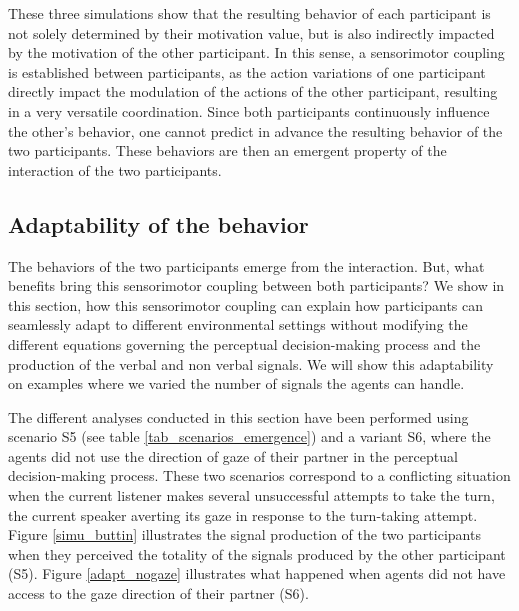 These three simulations show that the resulting behavior of each participant is not solely determined by their motivation value, but is also indirectly impacted by the motivation of the other participant. In this sense, a sensorimotor coupling is established between participants, as the action variations of one participant directly impact the modulation of the actions of the other participant, resulting in a very versatile coordination. Since both participants continuously influence the other's behavior, one cannot predict in advance the resulting behavior of the two participants. These behaviors are then an emergent property of the interaction of the two participants. 

\subsection{Adaptability of the behavior}

The behaviors of the two participants emerge from the interaction. But, what benefits bring this sensorimotor coupling between both participants?
We show in this section, how this sensorimotor coupling can explain how participants can seamlessly adapt to different environmental settings without modifying the different equations governing the perceptual decision-making process and the production of the verbal and non verbal signals. We will show this adaptability on examples where we varied the number of signals the agents can handle. 


The different analyses conducted in this section have been performed using scenario S5 (see table \ref{tab_scenarios_emergence}) and a variant S6, where the agents did not use the direction of gaze of their partner in the perceptual decision-making process. 
These two scenarios correspond to a conflicting situation when the current listener makes several unsuccessful attempts to take the turn, the current speaker averting its gaze in response to the turn-taking attempt. Figure \ref{simu_buttin} illustrates the signal production of the two participants when they perceived the totality of the signals produced by the other participant (S5). Figure \ref{adapt_nogaze} illustrates what happened when agents did not have access to the gaze direction of their partner (S6).

